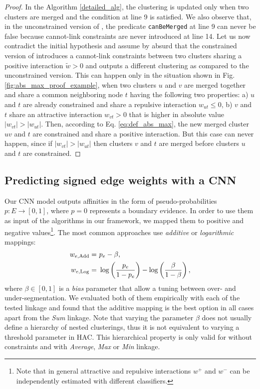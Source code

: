 \begin{proof}
In the \algname{} Algorithm \ref{detailed_alg}, the clustering is updated only when two clusters are merged and the condition at line 9 is satisfied. 
We also observe that, in the unconstrained version of \algname{}, the predicate \texttt{canBeMerged} at line 9 can never be false because cannot-link constraints are never introduced at line 14.
Let us now contradict the initial hypothesis and assume by absurd that the constrained version of \algname{} introduces a cannot-link constraints between two clusters sharing a positive interaction $\tilde{w}>0$ and outputs a different clustering as compared to the unconstrained version. 
This can happen only in the situation shown in Fig. \ref{fig:abs_max_proof_example}, when two clusters $u$ and $v$ are merged together and share a common neighboring node $t$ having the following two properties: a) $u$ and $t$ are already constrained and share a repulsive interaction $w_{ut}\leq0$, b) $v$ and $t$ share an attractive interaction $w_{vt}>0$ that is higher in absolute value $|w_{vt}|>|w_{ut}|$. 
Then, according to Eq. \ref{eq:def_abs_max}, the new merged cluster $uv$ and $t$ are constrained and share a positive interaction. 
But this case can never happen, since if $|w_{vt}|>|w_{ut}|$ then clusters $v$ and $t$ are merged before clusters $u$ and $t$ are constrained.  
\end{proof}



\subsection{Predicting signed edge weights with a CNN}
Our CNN model outputs affinities in the form of pseudo-probabilities $p:E \rightarrow [0,1]$, where $p=0$ represents a boundary evidence. In order to use them as input of the algorithms in our framework, we mapped them to positive and negative values\footnote{Note that in general attractive and repulsive interactions $w^+$ and $w^-$ can be independently estimated with different classifiers.}. The most common approaches use \emph{additive} \cite{ailon2008aggregating} or \emph{logarithmic} \cite{finkel2008enforcing,andres2012globally} mappings:
\begin{align} 
w_{e,\mathrm{Add}} =&\,\, p_e - \beta, \\
w_{e,\mathrm{Log}} =&\,\, \log \left( \frac{p_e}{1-p_e} \right) - \log \left( \frac{\beta}{1-\beta} \right), \label{eq:mappings}
\end{align}
where $\beta \in [0,1]$ is a \emph{bias} parameter that allow a tuning between over- and under-segmentation. We evaluated both of them empirically with each of the tested linkage and found that the additive mapping is the best option in all cases apart from the \emph{Sum} linkage. Note that varying the parameter $\beta$ does not usually define a hierarchy of nested clusterings, thus it is not equivalent to varying a threshold parameter in HAC. This hierarchical property is only valid for \algname{} without constraints and with \emph{Average}, \emph{Max} or \emph{Min} linkage.


